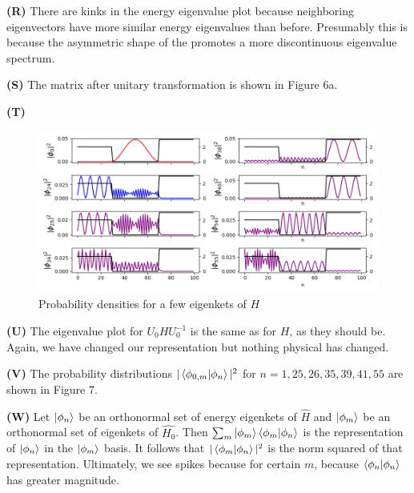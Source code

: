 \documentclass[12pt]{article}
\theoremstyle{definition}
\begin{document}
{\vspace{0.1in}
\noindent \textbf{(R)} There are kinks in the energy eigenvalue plot because neighboring eigenvectors have more similar energy eigenvalues than before. Presumably this is because the asymmetric shape of the promotes a more discontinuous eigenvalue spectrum.

\vspace{0.1in}
\noindent \textbf{(S)} The matrix after unitary transformation is shown in Figure 6a.

\vspace{0.1in}
\noindent \textbf{(T)} 

\begin{figure}[t!]
\centering
\includegraphics[width=17cm]{Figure_5}
\caption{Probability densities for a few eigenkets of $H$}
\label{fig:method}
\end{figure}
\vspace{0.1in}
\noindent \textbf{(U)} The eigenvalue plot for $U_{0}H U_{0}^{-1}$ is the same as for $H$, as they should be. Again, we have changed our representation but nothing physical has changed.

\vspace{0.1in}
\noindent \textbf{(V)} The probability distributions $|\bra{\phi_{0,m}}\ket{\phi_{n}}|^{2}$ for $n=1, 25, 26, 35, 39, 41, 55$ are shown in Figure 7.

\vspace{0.1in}
\noindent \textbf{(W)} Let $\ket{\phi_{n}}$ be an orthonormal set of energy eigenkets of $\hat{H}$ and $\ket{\phi_{m}}$ be an orthonormal set of eigenkets of $\hat{H_{0}}$. Then $\sum_{m}\ket{\phi_{m}}\bra{\phi_{m}}\ket{\phi_{n}}$ is the representation of $\ket{\phi_{n}}$ in the $\ket{\phi_{m}}$ basis. It follows that $|\bra{\phi_{m}}\ket{\phi_{n}}|^{2}$ is the norm squared of that representation. Ultimately, we see spikes because for certain $m$, because $\bra{\phi_{n}}\ket{\phi_{n}}$ has greater magnitude.

}
\end{document}
